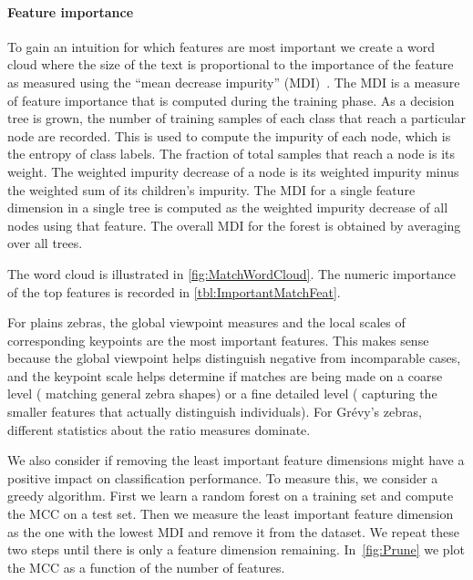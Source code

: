         \PositiveHist{}

        \PositiveROC{}


        \paragraph{Feature importance}

        To gain an intuition for which features are most important we create a word cloud where the size of the
          text is proportional to the importance of the feature as measured using the ``mean decrease impurity''
          (MDI)~\cite{louppe2014understanding}.
        The MDI is a measure of feature importance that is computed during the training phase.
        As a decision tree is grown, the number of training samples of each class that reach a particular node
          are recorded.
        This is used to compute the impurity of each node, which is the entropy of class labels.
        The fraction of total samples that reach a node is its weight.
        The weighted impurity decrease of a node is its weighted impurity minus the weighted sum of its
          children's impurity.
        The MDI for a single feature dimension in a single tree is computed as the weighted impurity decrease of
          all nodes using that feature.
        The overall MDI for the forest is obtained by averaging over all trees.

        The word cloud is illustrated in \cref{fig:MatchWordCloud}.
        The numeric importance of the top features is recorded in \cref{tbl:ImportantMatchFeat}.

        For plains zebras, the global viewpoint measures and the local scales of corresponding keypoints are the
          most important features.
        This makes sense because the global viewpoint helps distinguish negative from incomparable cases, and the
          keypoint scale helps determine if matches are being made on a coarse level (\eg{} matching general zebra
          shapes) or a fine detailed level (\ie{} capturing the smaller features that actually distinguish
          individuals).
        For Grévy's zebras, different statistics about the ratio measures dominate.

        \MatchWordCloud{}
        \ImportantMatchFeat{}

        We also consider if removing the least important feature dimensions might have a positive impact on
          classification performance.
        To measure this, we consider a greedy algorithm.
        First we learn a random forest on a training set and compute the MCC on a test set.
        Then we measure the least important feature dimension as the one with the lowest MDI and remove it from
          the dataset.
        We repeat these two steps until there is only a feature dimension remaining.
        In~\cref{fig:Prune} we plot the MCC as a function of the number of features.

